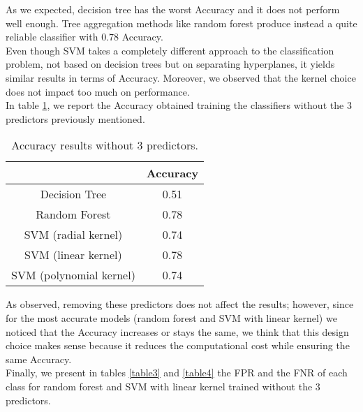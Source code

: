 \documentclass{article}
\begin{document}
As we expected, decision tree has the worst Accuracy and it does not perform well enough. Tree aggregation methods like random forest produce instead a quite reliable classifier with $0.78$ Accuracy. 
\\Even though SVM takes a completely different approach to the classification problem, not based on decision trees but on separating hyperplanes, it yields similar results in terms of Accuracy. Moreover, we observed that the kernel choice does not impact too much on performance.
\\In table \ref{table2}, we report the Accuracy obtained training the classifiers without the $3$ predictors previously mentioned.
\newpage

\begin{table}[ht]
 \centering
\begin{tabular}{ |c|c|} \hline
 &  Accuracy \\
\hline
Decision Tree & 0.51 \\ 
\hline
 Random Forest & 0.78 \\ 
\hline
 SVM (radial kernel) & 0.74 \\ 
\hline
 SVM (linear kernel) & 0.78  \\ 
\hline
 SVM (polynomial kernel) & 0.74 \\ 
\hline
\end{tabular}
\caption{Accuracy results without $3$ predictors.}\label{table2}
\end{table}

As observed, removing these predictors does not affect the results; however, since for the most accurate models (random forest and SVM with linear kernel) we noticed that the Accuracy increases or stays the same, we think that this design choice makes sense because it reduces the computational cost while ensuring the same Accuracy.
\\Finally, we present in tables \ref{table3} and \ref{table4} the FPR and the FNR of each class for random forest and SVM with linear kernel trained without the $3$ predictors. 
\end{document}
